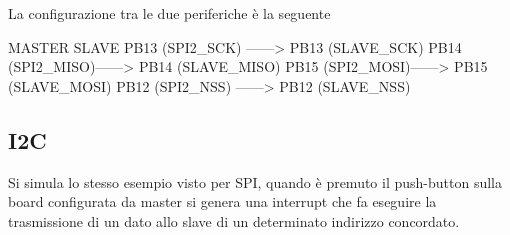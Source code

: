 La configurazione tra le due periferiche è la seguente \begin{DoxyVerb}        MASTER         SLAVE
    PB13 (SPI2_SCK) ------> PB13 (SLAVE_SCK)
    PB14 (SPI2_MISO)------> PB14 (SLAVE_MISO)
    PB15 (SPI2_MOSI)------> PB15 (SLAVE_MOSI)
    PB12 (SPI2_NSS) ------> PB12 (SLAVE_NSS)
\end{DoxyVerb}
 \hypertarget{index_fourthtwo}{}\subsection{I2C}\label{index_fourthtwo}
Si simula lo stesso esempio visto per S\+PI, quando è premuto il push-\/button sulla board configurata da master si genera una interrupt che fa eseguire la trasmissione di un dato allo slave di un determinato indirizzo concordato.

